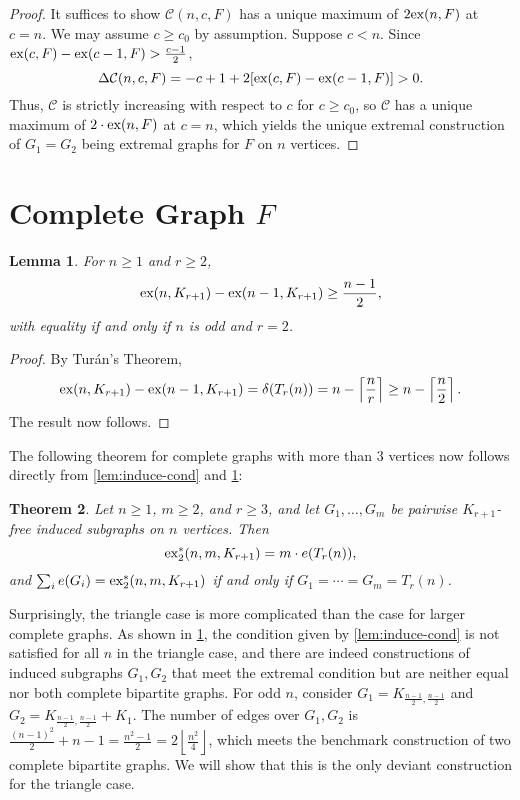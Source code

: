 \documentclass[12pt]{report}
\newtheorem{theorem}{Theorem}[chapter]
\newtheorem{lemma}[theorem]{Lemma}
\newcommand*{\ex}{\textnormal{ex}}
\newcommand*{\dex}{\textnormal{ex}_2}
\newcommand*{\con}{\mathcal{C}}
\begin{document}
\begin{proof}
  It suffices to show $\con(n, c, F)$ has a unique maximum of $2\ex(n, F)$ at $c = n$. We may assume $c \geq c_0$ by assumption. Suppose $c < n$. Since $\ex(c, F) - \ex(c - 1, F) > \frac{c - 1}{2}$,
  \[
    \Delta \con(n, c, F) = - c + 1 + 2[\ex(c, F) - \ex(c - 1, F)] > 0.
  \]
  Thus, $\con$ is strictly increasing with respect to $c$ for $c \geq c_0$, so $\con$ has a unique maximum of $2 \cdot \ex(n, F)$ at $c = n$, which yields the unique extremal construction of $G_1 = G_2$ being extremal graphs for $F$ on $n$ vertices.
\end{proof}

\section{Complete Graph $F$}

\begin{lemma}\label{lem:induce-complete-cond}
  For $n \geq 1$ and $r \geq 2$,
  \[
    \ex(n, K_{r + 1}) - \ex(n - 1, K_{r + 1}) \geq \frac{n - 1}{2},
  \]
  with equality if and only if $n$ is odd and $r = 2$.
\end{lemma}

\begin{proof}
  By Turán's Theorem,
  \[
    \ex(n, K_{r + 1}) - \ex(n - 1, K_{r + 1}) = \delta(T_r(n)) = n - \left\lceil \frac{n}{r} \right\rceil \geq n - \left\lceil\frac{n}{2}\right\rceil.
  \]
  The result now follows.
\end{proof}

The following theorem for complete graphs with more than $3$ vertices now follows directly from \cref{lem:induce-cond} and \cref{lem:induce-complete-cond}:

\begin{theorem}\label{thm:induce-complete-no-triangle}
  Let $n \geq 1$, $m \geq 2$, and $r \geq 3$, and let $G_1, \ldots, G_m$ be pairwise $K_{r + 1}$-free induced subgraphs on $n$ vertices. Then
  \[
    \dex^*(n, m, K_{r + 1}) = m \cdot e(T_{r}(n)),
  \]
  and $\sum_i e(G_i) = \dex^*(n, m, K_{r + 1})$ if and only if $G_1 = \cdots = G_m = T_{r}(n)$.
\end{theorem}

Surprisingly, the triangle case is more complicated than the case for larger complete graphs. As shown in \cref{lem:induce-complete-cond}, the condition given by \cref{lem:induce-cond} is not satisfied for all $n$ in the triangle case, and there are indeed constructions of induced subgraphs $G_1, G_2$ that meet the extremal condition but are neither equal nor both complete bipartite graphs. For odd $n$, consider $G_1 = K_{\frac{n - 1}{2}, \frac{n - 1}{2}}$ and $G_2 = K_{\frac{n - 1}{2}, \frac{n - 1}{2}} + K_1$. The number of edges over $G_1, G_2$ is $\frac{(n - 1)^2}{2} + n - 1 = \frac{n^2 - 1}{2} = 2\left\lfloor \frac{n^2}{4}\right\rfloor$, which meets the benchmark construction of two complete bipartite graphs. We will show that this is the only deviant construction for the triangle case.
\end{document}
